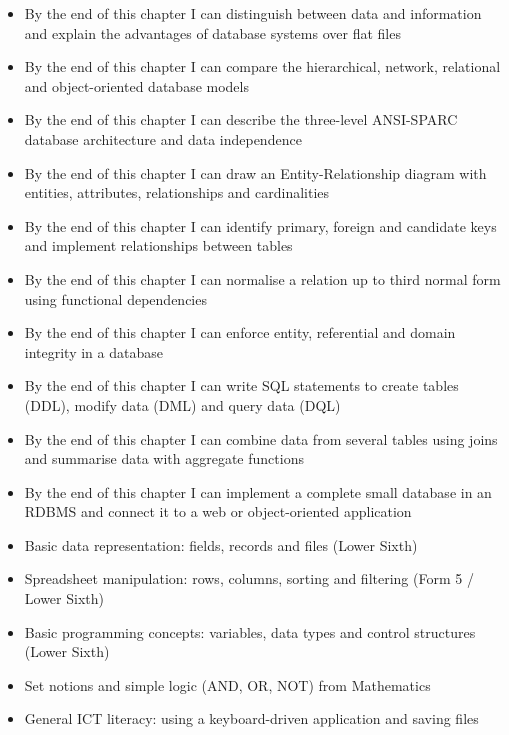 \documentclass[11pt]{article}
\begin{document}
\begin{objectifs}
\begin{itemize}
\item By the end of this chapter I can distinguish between data and information and explain the advantages of database systems over flat files
\item By the end of this chapter I can compare the hierarchical, network, relational and object-oriented database models
\item By the end of this chapter I can describe the three-level ANSI-SPARC database architecture and data independence
\item By the end of this chapter I can draw an Entity-Relationship diagram with entities, attributes, relationships and cardinalities
\item By the end of this chapter I can identify primary, foreign and candidate keys and implement relationships between tables
\item By the end of this chapter I can normalise a relation up to third normal form using functional dependencies
\item By the end of this chapter I can enforce entity, referential and domain integrity in a database
\item By the end of this chapter I can write SQL statements to create tables (DDL), modify data (DML) and query data (DQL)
\item By the end of this chapter I can combine data from several tables using joins and summarise data with aggregate functions
\item By the end of this chapter I can implement a complete small database in an RDBMS and connect it to a web or object-oriented application
\end{itemize}
\end{objectifs}

\begin{prerequis}
\begin{itemize}
\item Basic data representation: fields, records and files (Lower Sixth)
\item Spreadsheet manipulation: rows, columns, sorting and filtering (Form 5 / Lower Sixth)
\item Basic programming concepts: variables, data types and control structures (Lower Sixth)
\item Set notions and simple logic (AND, OR, NOT) from Mathematics
\item General ICT literacy: using a keyboard-driven application and saving files
\end{itemize}
\end{prerequis}
\end{document}

